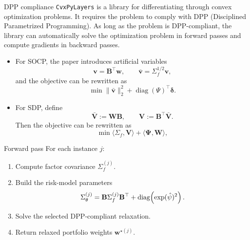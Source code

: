 \documentclass[10pt,aspectratio=169]{beamer}
\newcommand{\Param}{\theta}
\newcommand{\SigmaMat}{\Sigma}
\newcommand{\diagv}{\operatorname{diag}}
\begin{document}
\begin{frame}{DPP compliance}
  \small
  \texttt{CvxPyLayers} \parencite{AgrawalAmosEtAl2019Layers} is a library for differentiating through convex optimization problems. It requires the problem to comply with DPP (Disciplined Parametrized Programming). As long as the problem is DPP-compliant, the library can automatically solve the optimization problem in forward passes and compute gradients in backward passes.
  \begin{itemize}
    \small
    \item For SOCP, the paper introduces artificial variables
  \[
    \mathbf{v} = \mathbf{B}^\top \mathbf{w},\qquad
    \bar{\mathbf{v}} = \SigmaMat_f^{1/2}\mathbf{v},
  \]
  and the objective can be rewritten as 
  \[ \min \|\bar{\mathbf{v}}\|_2^2 + \diagv(\Psi)^\top\boldsymbol{\delta}.\]

  \item For SDP, define 
  \[
    \mathbf{\bar{V}} := \mathbf{W} \mathbf{B}, \qquad \mathbf{V} := \mathbf{B}^\top \mathbf{\bar{V}}.
    \]  
    Then the objective can be rewritten as 
    \[ \min \langle \SigmaMat_f, \mathbf{V} \rangle + \langle \boldsymbol{\Psi}, \mathbf{W} \rangle,\]
  \end{itemize}

\end{frame}

\begin{frame}{Forward pass}
    \small 
  For each instance $j$:
  \begin{enumerate}
    \item Compute factor covariance $\SigmaMat_f^{(j)}$.
    \item Build the risk-model parameters
    \[
      \SigmaMat_\Param^{(j)}
      =
      \mathbf{B}\SigmaMat_f^{(j)}\mathbf{B}^\top
      +
      \diag\!\left(\exp(\hat\psi)^2\right).
    \]
    \item Solve the selected DPP-compliant relaxation.
    \item Return relaxed portfolio weights $\mathbf w^{\star(j)}$.
  \end{enumerate}

\end{frame}
\end{document}
